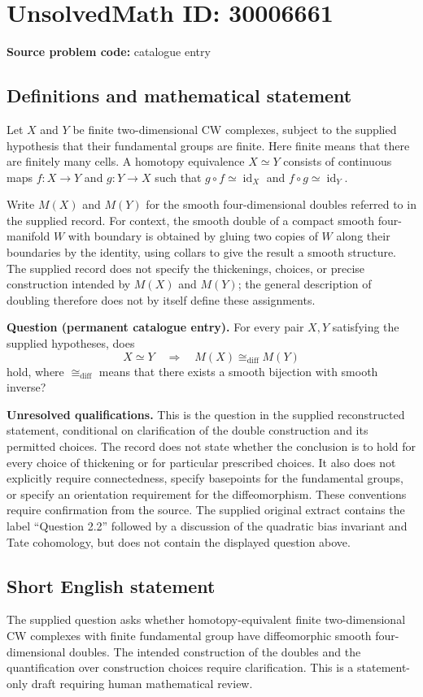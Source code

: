 \documentclass[11pt]{article}
\begin{document}
\section*{UnsolvedMath ID: 30006661}
\textbf{Source problem code:} catalogue entry
\subsection{Definitions and mathematical statement}
Let \(X\) and \(Y\) be finite two-dimensional CW complexes, subject to the supplied hypothesis that their fundamental groups are finite. Here finite means that there are finitely many cells. A homotopy equivalence \(X\simeq Y\) consists of continuous maps \(f:X\to Y\) and \(g:Y\to X\) such that \(g\circ f\simeq\operatorname{id}_X\) and \(f\circ g\simeq\operatorname{id}_Y\).

Write \(M(X)\) and \(M(Y)\) for the smooth four-dimensional doubles referred to in the supplied record. For context, the smooth double of a compact smooth four-manifold \(W\) with boundary is obtained by gluing two copies of \(W\) along their boundaries by the identity, using collars to give the result a smooth structure. The supplied record does not specify the thickenings, choices, or precise construction intended by \(M(X)\) and \(M(Y)\); the general description of doubling therefore does not by itself define these assignments.

\textbf{Question (permanent catalogue entry).} For every pair \(X,Y\) satisfying the supplied hypotheses, does
\[
X\simeq Y\quad\Longrightarrow\quad M(X)\cong_{\mathrm{diff}}M(Y)
\]
hold, where \(\cong_{\mathrm{diff}}\) means that there exists a smooth bijection with smooth inverse?

\textbf{Unresolved qualifications.} This is the question in the supplied reconstructed statement, conditional on clarification of the double construction and its permitted choices. The record does not state whether the conclusion is to hold for every choice of thickening or for particular prescribed choices. It also does not explicitly require connectedness, specify basepoints for the fundamental groups, or specify an orientation requirement for the diffeomorphism. These conventions require confirmation from the source. The supplied original extract contains the label ``Question 2.2'' followed by a discussion of the quadratic bias invariant and Tate cohomology, but does not contain the displayed question above.
\subsection{Short English statement}
The supplied question asks whether homotopy-equivalent finite two-dimensional CW complexes with finite fundamental group have diffeomorphic smooth four-dimensional doubles. The intended construction of the doubles and the quantification over construction choices require clarification. This is a statement-only draft requiring human mathematical review.
\end{document}
